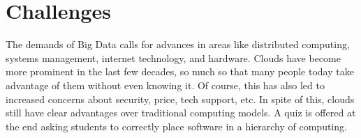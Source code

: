 \section{Challenges}

The demands of Big Data calls for advances in areas like distributed
computing, systems management, internet technology, and hardware. Clouds
have become more prominent in the last few decades, so much so that many
people today take advantage of them without even knowing it. Of course,
this has also led to increased concerns about security, price, tech
support, etc. In spite of this, clouds still have clear advantages over
traditional computing models. A quiz is offered at the end asking
students to correctly place software in a hierarchy of computing.


